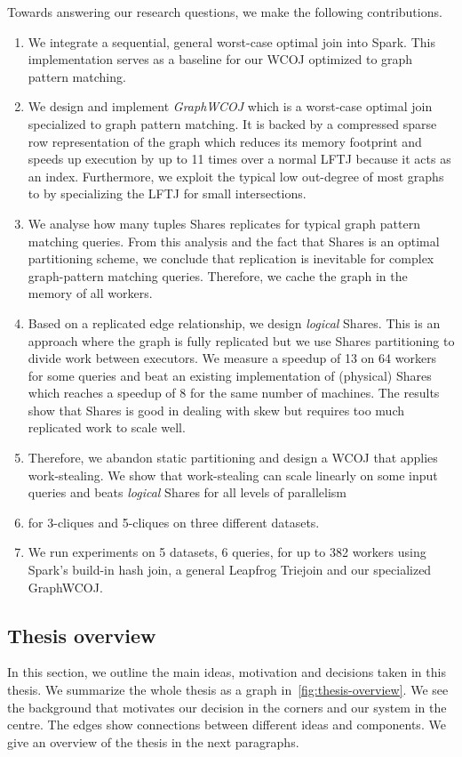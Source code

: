 Towards answering our research questions, we make the following contributions.
\begin{enumerate}
    \item We integrate a sequential, general worst-case optimal join into Spark.
    This implementation serves as a baseline for our \textsc{WCOJ} optimized to graph pattern matching.
    \item We design and implement \textit{GraphWCOJ} which is a worst-case optimal join specialized to graph pattern matching.
    It is backed by a compressed sparse row representation of the graph which reduces its memory footprint and speeds up execution by up
    to 11 times over a normal \textsc{LFTJ} because it acts as an index. %
    Furthermore, we exploit the typical low out-degree of most graphs to by specializing the \textsc{LFTJ} for small intersections.
    \item We analyse how many tuples Shares replicates for typical graph pattern matching queries.
    From this analysis and the fact that Shares is an optimal partitioning scheme, we conclude that replication is inevitable for complex
    graph-pattern matching queries.
    Therefore, we cache the graph in the memory of all workers.
    \item Based on a replicated edge relationship, we design \textit{logical} Shares.
    This is an approach where the graph is fully replicated but we use Shares partitioning to divide work between executors.
    We measure a speedup of 13 on 64 workers for some queries and beat an existing implementation of (physical) Shares which reaches
    a speedup of 8 for the same number of machines.
    The results show that Shares is good in dealing with skew but requires too much replicated work to scale well.
    \item Therefore, we abandon static partitioning and design a \textsc{WCOJ} that applies work-stealing.
    We show that work-stealing can scale linearly on some input queries and beats \textit{logical} Shares for all levels of parallelism
    \item for 3-cliques and 5-cliques on three different datasets.
    \item We run experiments on 5 datasets, 6 queries, for up to 382 workers using Spark's build-in hash join,
    a general Leapfrog Triejoin and our specialized GraphWCOJ.
\end{enumerate}

\subsection{Thesis overview} \label{subsec:thesis-idea}
In this section, we outline the main ideas, motivation and decisions taken in this thesis.
We summarize the whole thesis as a graph in~\cref{fig:thesis-overview}.
We see the background that motivates our decision in the corners and our system in the centre.
The edges show connections between different ideas and components.
We give an overview of the thesis in the next paragraphs.

